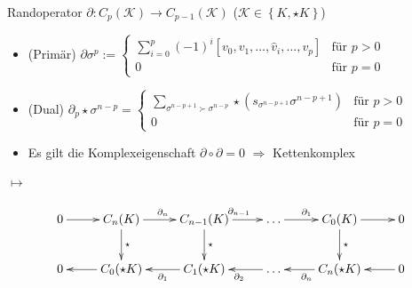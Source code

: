 \documentclass{beamer}
\begin{document}
  \begin{frame}
    \begin{block}{Randoperator \( \partial: C_{p}(\mathcal{K}) \rightarrow C_{p-1}(\mathcal{K}) \) \quad(\(\mathcal{K}\in\left\{ K, \star K \right\}  \))} 
      \begin{itemize}
        \item<1-> (Primär) \(  \partial\sigma^{p} :=
                                \begin{cases}
                                  \sum\limits_{i=0}^{p} (-1)^{i} \left[ v_{0}, v_{1}, \ldots, \hat{v}_{i}, \ldots, v_{p} \right] & \text{für } p>0 \\
                                  0 & \text{für } p=0
                                \end{cases}
                            \)
        \item<2-> (Dual) \( \partial_{p}\star\sigma^{n-p} =  
                               \begin{cases}
                                  \sum\limits_{\sigma^{n-p+1} \succ \sigma^{n-p}} \star \left( s_{\sigma^{n-p+1}} \sigma^{n-p+1} \right) & \text{für } p>0 \\
                                  0 & \text{für } p=0
                                \end{cases}
                          \)
        \item<3-> Es gilt die Komplexeigenschaft \( \partial\circ\partial = 0 \) \quad\( \Rightarrow \) Kettenkomplex
      \end{itemize}
    \end{block}
    \begin{overprint}
        \begin{minipage}{0.4\textwidth}
          \centering 
        \end{minipage}\hfill
       {\Huge\(\longmapsto\)}  \hfill
       \begin{minipage}{0.4\textwidth}
          \centering 
        \end{minipage}
          \begin{align*}
      \begin{xy}
        \xymatrix{
          0 \ar[r] & 
          C_{n}(K) \ar[r]^{\partial_{n}} \ar[d]^{\star} & 
          C_{n-1}(K) \ar[r]^{\partial_{n-1}} \ar[d]^{\star} & 
          \ldots \ar[r]^{\partial_{1}} & 
          C_{0}(K) \ar[r] \ar[d]^{\star} &
          0 \\
          0  & 
          C_{0}(\star K) \ar[l] & 
          C_{1}( \star K) \ar[l]^{\partial_{1}} & 
          \ldots \ar[l]^{\partial_{2}} & 
          C_{n}(\star K) \ar[l]^{\partial_{n}} &
          0 \ar[l]
        }
      \end{xy}
    \end{align*}
    \end{overprint}
  \end{frame}
\end{document}
